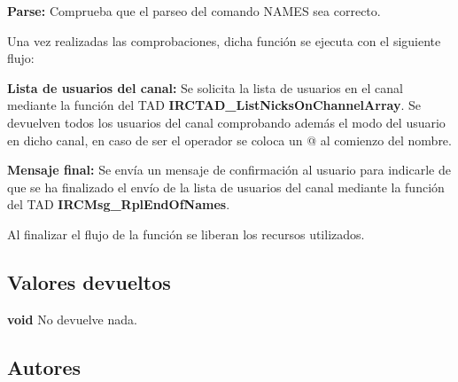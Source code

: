 \begin{DoxyItemize}
\item {\bfseries Parse\+:} Comprueba que el parseo del comando N\+A\+M\+E\+S sea correcto. 
\end{DoxyItemize}

Una vez realizadas las comprobaciones, dicha función se ejecuta con el siguiente flujo\+:


\begin{DoxyItemize}
\item {\bfseries Lista de usuarios del canal\+:} Se solicita la lista de usuarios en el canal mediante la función del T\+A\+D {\bfseries I\+R\+C\+T\+A\+D\+\_\+\+List\+Nicks\+On\+Channel\+Array}. Se devuelven todos los usuarios del canal comprobando además el modo del usuario en dicho canal, en caso de ser el operador se coloca un @ al comienzo del nombre.  
\item {\bfseries Mensaje final\+:} Se envía un mensaje de confirmación al usuario para indicarle de que se ha finalizado el envío de la lista de usuarios del canal mediante la función del T\+A\+D {\bfseries I\+R\+C\+Msg\+\_\+\+Rpl\+End\+Of\+Names}.  
\end{DoxyItemize}

Al finalizar el flujo de la función se liberan los recursos utilizados.\hypertarget{server_command_names_return_names}{}\subsection{Valores devueltos}\label{server_command_names_return_names}

\begin{DoxyItemize}
\item {\bfseries void} No devuelve nada. 
\end{DoxyItemize}\hypertarget{server_command_names_authors_names}{}\subsection{Autores}\label{server_command_names_authors_names}

